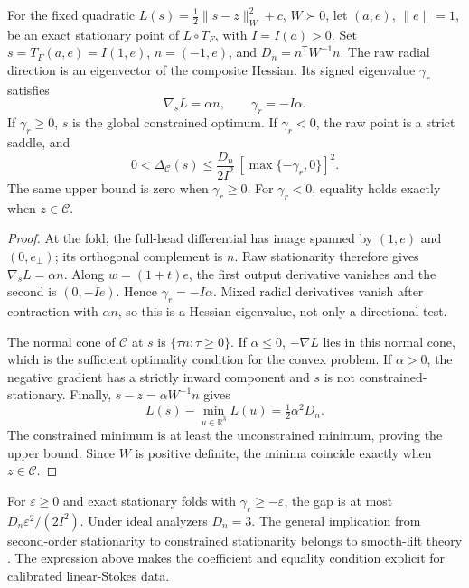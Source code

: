 \begin{theorem}
\label{thm:certificate}
For the fixed quadratic $L(s)=\tfrac12\|s-z\|_W^2+c$, $W\succ0$, let $(a,e)$, $\|e\|=1$, be an exact stationary point of $L\circ T_F$, with $I=I(a)>0$. Set $s=T_F(a,e)=I(1,e)$, $n=(-1,e)$, and $D_n=n^{\mathsf T}W^{-1}n$. The raw radial direction is an eigenvector of the composite Hessian. Its signed eigenvalue $\gamma_r$ satisfies
\begin{equation}
 \nabla_s L=\alpha n,\qquad \gamma_r=-I\alpha.
 \label{eq:normalcurvature}
\end{equation}
If $\gamma_r\geq0$, $s$ is the global constrained optimum. If $\gamma_r<0$, the raw point is a strict saddle, and
\begin{equation}
 0<\Delta_{\mathcal C}(s)\leq
 \frac{D_n}{2I^2}\,[\max\{-\gamma_r,0\}]^2.
 \label{eq:curvaturecertificate}
\end{equation}
The same upper bound is zero when $\gamma_r\geq0$. For $\gamma_r<0$, equality holds exactly when $z\in\mathcal C$.
\end{theorem}
\begin{proof}
At the fold, the full-head differential has image spanned by $(1,e)$ and $(0,e_\perp)$; its orthogonal complement is $n$. Raw stationarity therefore gives $\nabla_sL=\alpha n$. Along $w=(1+t)e$, the first output derivative vanishes and the second is $(0,-Ie)$. Hence $\gamma_r=-I\alpha$. Mixed radial derivatives vanish after contraction with $\alpha n$, so this is a Hessian eigenvalue, not only a directional test.

The normal cone of $\mathcal C$ at $s$ is $\{\tau n:\tau\geq0\}$. If $\alpha\leq0$, $-\nabla L$ lies in this normal cone, which is the sufficient optimality condition for the convex problem. If $\alpha>0$, the negative gradient has a strictly inward component and $s$ is not constrained-stationary. Finally, $s-z=\alpha W^{-1}n$ gives
\begin{equation*}
 L(s)-\min_{u\in\mathbb R^3}L(u)=\tfrac12\alpha^2D_n.
\end{equation*}
The constrained minimum is at least the unconstrained minimum, proving the upper bound. Since $W$ is positive definite, the minima coincide exactly when $z\in\mathcal C$.
\end{proof}
For $\varepsilon\geq0$ and exact stationary folds with $\gamma_r\geq-\varepsilon$, the gap is at most $D_n\varepsilon^2/(2I^2)$. Under ideal analyzers $D_n=3$. The general implication from second-order stationarity to constrained stationarity belongs to smooth-lift theory \cite{lifts}. The expression above makes the coefficient and equality condition explicit for calibrated linear-Stokes data.


